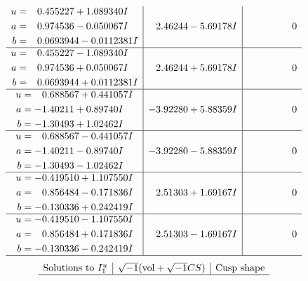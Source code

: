 \documentclass[1p]{elsarticle_modified}
\theoremstyle{definition}
\newcommand{\I}{\sqrt{-1}}
\begin{document}
$$\begin{array}{c|c|c}
\begin{aligned}
u &= \phantom{-}0.455227 + 1.089340 I \\
a &= \phantom{-}0.974536 - 0.050067 I \\
b &= \phantom{-}0.0693944 - 0.0112381 I\end{aligned}
 & \phantom{-}2.46244 - 5.69178 I & \phantom{-0.000000 } 0 \\ \hline\begin{aligned}
u &= \phantom{-}0.455227 - 1.089340 I \\
a &= \phantom{-}0.974536 + 0.050067 I \\
b &= \phantom{-}0.0693944 + 0.0112381 I\end{aligned}
 & \phantom{-}2.46244 + 5.69178 I & \phantom{-0.000000 } 0 \\ \hline\begin{aligned}
u &= \phantom{-}0.688567 + 0.441057 I \\
a &= -1.40211 + 0.89740 I \\
b &= -1.30493 + 1.02462 I\end{aligned}
 & -3.92280 + 5.88359 I & \phantom{-0.000000 } 0 \\ \hline\begin{aligned}
u &= \phantom{-}0.688567 - 0.441057 I \\
a &= -1.40211 - 0.89740 I \\
b &= -1.30493 - 1.02462 I\end{aligned}
 & -3.92280 - 5.88359 I & \phantom{-0.000000 } 0 \\ \hline\begin{aligned}
u &= -0.419510 + 1.107550 I \\
a &= \phantom{-}0.856484 - 0.171836 I \\
b &= -0.130336 + 0.242419 I\end{aligned}
 & \phantom{-}2.51303 + 1.69167 I & \phantom{-0.000000 } 0 \\ \hline\begin{aligned}
u &= -0.419510 - 1.107550 I \\
a &= \phantom{-}0.856484 + 0.171836 I \\
b &= -0.130336 - 0.242419 I\end{aligned}
 & \phantom{-}2.51303 - 1.69167 I & \phantom{-0.000000 } 0\\
 \hline 
 \end{array}$$\newpage$$\begin{array}{c|c|c}  
\text{Solutions to }I^u_{1}& \I (\text{vol} + \sqrt{-1}CS) & \text{Cusp shape}\\
 \hline 

\end{array}$$
\end{document}
